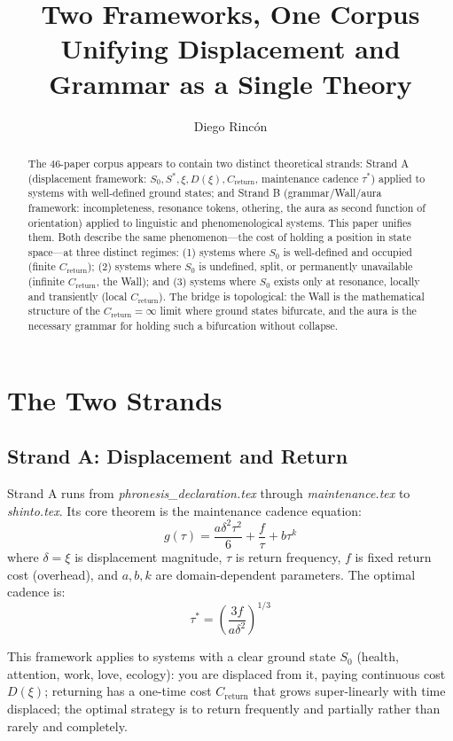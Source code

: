 \documentclass[12pt]{article}
\title{Two Frameworks, One Corpus\\
Unifying Displacement and Grammar as a Single Theory}
\author{Diego Rincón}
\date{}
\begin{document}
\maketitle

\begin{abstract}
The 46-paper corpus appears to contain two distinct theoretical strands: Strand A (displacement framework: $S_0, S^*, \xi, D(\xi), C_{\text{return}}$, maintenance cadence $\tau^*$) applied to systems with well-defined ground states; and Strand B (grammar/Wall/aura framework: incompleteness, resonance tokens, othering, the aura as second function of orientation) applied to linguistic and phenomenological systems. This paper unifies them. Both describe the same phenomenon—the cost of holding a position in state space—at three distinct regimes: (1) systems where $S_0$ is well-defined and occupied (finite $C_{\text{return}}$); (2) systems where $S_0$ is undefined, split, or permanently unavailable (infinite $C_{\text{return}}$, the Wall); and (3) systems where $S_0$ exists only at resonance, locally and transiently (local $C_{\text{return}}$). The bridge is topological: the Wall is the mathematical structure of the $C_{\text{return}} = \infty$ limit where ground states bifurcate, and the aura is the necessary grammar for holding such a bifurcation without collapse.
\end{abstract}

\section{The Two Strands}

\subsection{Strand A: Displacement and Return}

Strand A runs from \textit{phronesis\_declaration.tex} through \textit{maintenance.tex} to \textit{shinto.tex}. Its core theorem is the maintenance cadence equation:
\[
g(\tau) = \frac{a\delta^2\tau^2}{6} + \frac{f}{\tau} + b\tau^k
\]
where $\delta = \xi$ is displacement magnitude, $\tau$ is return frequency, $f$ is fixed return cost (overhead), and $a, b, k$ are domain-dependent parameters. The optimal cadence is:
\[
\tau^* = \left( \frac{3f}{a\delta^2} \right)^{1/3}
\]

This framework applies to systems with a clear ground state $S_0$ (health, attention, work, love, ecology): you are displaced from it, paying continuous cost $D(\xi)$; returning has a one-time cost $C_{\text{return}}$ that grows super-linearly with time displaced; the optimal strategy is to return frequently and partially rather than rarely and completely.
\end{document}
